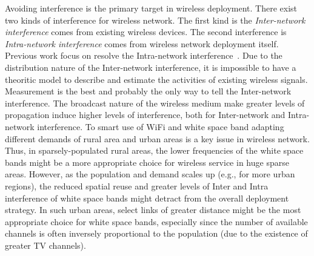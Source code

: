 Avoiding interference is the primary target in wireless deployment.
There exist two kinds of interference for wireless network. The first kind 
is the {\it Inter-network interference} comes from existing wireless devices.
The second interference is {\it Intra-network interference} comes from wireless 
network deployment itself. Previous work focus on resolve the Intra-network 
interference~\cite{subramanian2008minimum,ramachandran2006interference,si2010overview}.
Due to the distribution nature of the Inter-network interference,
it is impossible to have a theoritic model to describe and estimate the activities of existing
 wireless signals. Measurement is the best and probably the only way to tell the Inter-network
  interference. The broadcast nature of the wireless medium make greater levels of propagation 
  induce higher levels of interference, both for Inter-network
and Intra-network interference. To smart use of WiFi and white space band adapting different 
demands of rural area and urban areas is a key issue in wireless network. 
Thus, in sparsely-populated rural areas, the lower frequencies of the white space 
bands might be a more appropriate choice for wireless service in huge sparse areas. 
However, as the population and demand scales up (e.g., 
for more urban regions), the reduced spatial reuse and greater levels of Inter and Intra interference 
of white space bands might detract from the overall deployment strategy. In 
such urban areas, select links of greater distance might be the most 
appropriate choice for white space bands, especially since the number of 
available channels is often inversely proportional to the population (due 
to the existence of greater TV channels).


